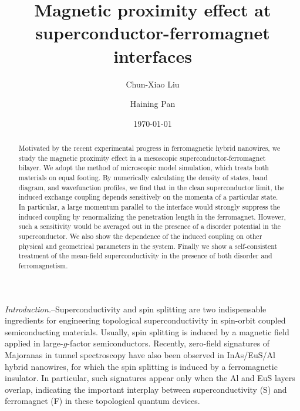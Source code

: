 \documentclass[aps,prl,twocolumn,superscriptaddress,showpacs,longbibliography]{revtex4-1}
\begin{document}
\title{Magnetic proximity effect at superconductor-ferromagnet interfaces}

\author{Chun-Xiao Liu}

\author{Haining Pan}

\date{\today}

\begin{abstract}
Motivated by the recent experimental progress in ferromagnetic hybrid nanowires, we study the magnetic proximity effect in a mesoscopic superconductor-ferromagnet bilayer.
We adopt the method of microscopic model simulation, which treats both materials on equal footing.
By numerically calculating the density of states, band diagram, and wavefunction profiles, we find that in the clean superconductor limit, the induced exchange coupling depends sensitively on the momenta of a particular state.
In particular, a large momentum parallel to the interface would strongly suppress the induced coupling by renormalizing the penetration length in the ferromagnet.
However, such a sensitivity would be averaged out in the presence of a disorder potential in the superconductor.
We also show the dependence of the induced coupling on other physical and geometrical parameters in the system. 
Finally we show a self-consistent treatment of the mean-field superconductivity in the presence of both disorder and ferromagnetism.
\end{abstract}



\maketitle


\emph{Introduction.}--Superconductivity and spin splitting are two indispensable ingredients for engineering topological superconductivity in spin-orbit coupled semiconducting materials.
Usually, spin splitting is induced by a magnetic field applied in large-$g$-factor semiconductors.
Recently, zero-field signatures of Majoranas in tunnel spectroscopy have also been observed in InAs/EuS/Al hybrid nanowires, for which the spin splitting is induced by a ferromagnetic insulator.
In particular, such signatures appear only when the Al and EuS layers overlap, indicating the important interplay between superconductivity (S) and ferromagnet (F) in these topological quantum devices.
\end{document}
